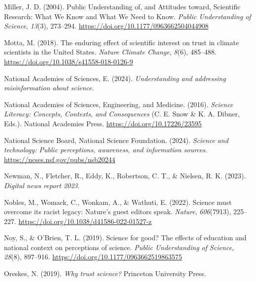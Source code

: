 \documentclass[
  jou,
  floatsintext,
  longtable,
  nolmodern,
  notxfonts,
  notimes,
  colorlinks=true,linkcolor=blue,citecolor=blue,urlcolor=blue]{apa7}
\newlength{\cslhangindent}
\newenvironment{CSLReferences}[2] %
 {\begin{list}{}{%
  \setlength{\itemindent}{0pt}
  \setlength{\leftmargin}{0pt}
  \setlength{\parsep}{0pt}
  \ifodd #1
   \setlength{\leftmargin}{\cslhangindent}
   \setlength{\itemindent}{-1\cslhangindent}
  \fi
  \setlength{\itemsep}{#2\baselineskip}}}
 {\end{list}}
\begin{document}
\begin{CSLReferences}{1}{0}
Miller, J. D. (2004). Public Understanding of, and Attitudes toward,
Scientific Research: What We Know and What We Need to Know. \emph{Public
Understanding of Science}, \emph{13}(3), 273--294.
\url{https://doi.org/10.1177/0963662504044908}

Motta, M. (2018). The enduring effect of scientific interest on trust in
climate scientists in the United States. \emph{Nature Climate Change},
\emph{8}(6), 485--488. \url{https://doi.org/10.1038/s41558-018-0126-9}

National Academies of Sciences, E. (2024). \emph{Understanding and
addressing misinformation about science}.

National Academies of Sciences, Engineering, and Medicine. (2016).
\emph{Science Literacy: Concepts, Contexts, and Consequences} (C. E.
Snow \& K. A. Dibner, Eds.). National Academies Press.
\url{https://doi.org/10.17226/23595}

National Science Board, National Science Foundation. (2024).
\emph{Science and technology: Public perceptions, awareness, and
information sources.} \url{https://ncses.nsf.gov/pubs/nsb20244}

Newman, N., Fletcher, R., Eddy, K., Robertson, C. T., \& Nielsen, R. K.
(2023). \emph{Digital news report 2023}.

Nobles, M., Womack, C., Wonkam, A., \& Wathuti, E. (2022). Science must
overcome its racist legacy: Nature{'}s guest editors speak.
\emph{Nature}, \emph{606}(7913), 225--227.
\url{https://doi.org/10.1038/d41586-022-01527-z}

Noy, S., \& O'Brien, T. L. (2019). Science for good? The effects of
education and national context on perceptions of science. \emph{Public
Understanding of Science}, \emph{28}(8), 897--916.
\url{https://doi.org/10.1177/0963662519863575}

Oreskes, N. (2019). \emph{Why trust science?} Princeton University
Press.


\end{CSLReferences}
\end{document}
